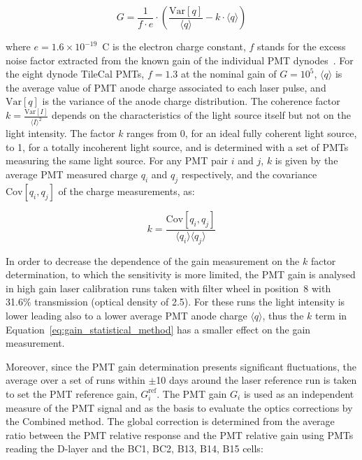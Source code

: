 \begin{equation}
	G = \frac{1}{f \cdot e}\cdot \left( \frac{\mathrm{Var}[q]}{\langle q\rangle} - k \cdot \langle q\rangle \right)
	\label{eq:gain_statistical_method}
\end{equation}

where $e=1.6\times 10^{-19}$~C is the electron charge constant, $f$ stands for the excess noise factor extracted from the known gain of the individual PMT dynodes~\cite{Arisaka:2000id}.  For the eight dynode TileCal PMTs, $f=1.3$ at the nominal gain of $G=10^5$, $\langle q \rangle$ is the average value of PMT anode charge associated to each laser pulse, and $\mathrm{Var}[q]$ is the variance of the anode charge distribution. 
The coherence factor $k = \frac{\mathrm{Var}[I]}{\langle I\rangle ^2}$ depends on the characteristics of the light source itself but not on the light intensity. The factor $k$ ranges from 0, for an ideal fully coherent light source, to 1, for a totally incoherent light source, and is determined with a set of PMTs measuring the same light source. For any PMT pair $i$ and $j$, $k$ is given by the average PMT measured charge $q_i$ and $q_j$ respectively, and the covariance $\mathrm{Cov}[q_i, q_j]$ of the charge measurements, as:

\begin{equation}
	k = \frac{\mathrm{Cov}[q_i, q_j]}{\langle q_i\rangle \langle q_j\rangle}
	\label{eq:PMT_excess_noise_factor}
\end{equation}

In order to decrease the dependence of the gain measurement on the $k$ factor determination, to which the sensitivity is more limited, the PMT gain is analysed in high gain laser calibration runs taken with filter wheel in position~8 with 31.6\% transmission (optical density of 2.5). For these runs the light intensity is lower leading also to a lower average PMT anode charge $\langle q \rangle$, thus the $k$ term in Equation~\ref{eq:gain_statistical_method} has a smaller effect on the gain measurement.

Moreover, since the PMT gain determination presents significant fluctuations, the average over a set of runs within $\pm$10 days around the laser reference run is taken to set the PMT reference gain, $G_i^{\mathrm{ref}}$. The PMT gain $G_i$ is used as an independent measure of the PMT signal and as the basis to evaluate the optics corrections by the Combined method. The global correction is determined from the average ratio between the PMT relative response and the PMT relative gain using PMTs reading the D-layer and the BC1, BC2, B13, B14, B15 cells:


